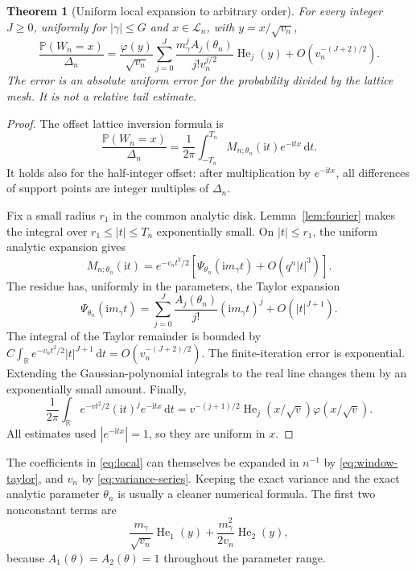\documentclass[11pt]{article}
\newtheorem{theorem}{Theorem}[section]
\theoremstyle{definition}
\newcommand{\Prob}{\mathbb P}
\newcommand{\He}{\operatorname{He}}
\newcommand{\dd}{\,\mathrm d}
\newcommand{\ii}{\mathrm i}
\begin{document}
\begin{theorem}[Uniform local expansion to arbitrary order]\label{thm:local}
For every integer $J\geq0$, uniformly for $|\gamma|\leq G$ and
$x\in\mathcal L_n$, with $y=x/\sqrt{v_n}$,
\begin{equation}\label{eq:local}
 \frac{\Prob(W_n=x)}{\Delta_n}
   =\frac{\varphi(y)}{\sqrt{v_n}}
      \sum_{j=0}^{J}
       \frac{m_\gamma^jA_j(\theta_n)}{j!v_n^{j/2}}\He_j(y)
      +O\!\left(v_n^{-(J+2)/2}\right).
\end{equation}
The error is an absolute uniform error for the probability divided by
the lattice mesh. It is not a relative tail estimate.
\end{theorem}

\begin{proof}
The offset lattice inversion formula is
\begin{equation}\label{eq:inversion}
 \frac{\Prob(W_n=x)}{\Delta_n}
    =\frac1{2\pi}\int_{-T_n}^{T_n}
          M_{n;\theta_n}(\ii t)e^{-\ii tx}\dd t.
\end{equation}
It holds also for the half-integer offset: after multiplication by
$e^{-\ii tx}$, all differences of support points are integer multiples
of $\Delta_n$.

Fix a small radius $r_1$ in the common analytic disk. Lemma~\ref{lem:fourier}
makes the integral over $r_1\leq|t|\leq T_n$ exponentially small.
On $|t|\leq r_1$, the uniform analytic expansion gives
\[
 M_{n;\theta_n}(\ii t)
   =e^{-v_nt^2/2}
       \left[\Psi_{\theta_n}(\ii m_\gamma t)+O(q^n|t|^3)\right].
\]
The residue has, uniformly in the parameters, the Taylor expansion
\[
 \Psi_{\theta_n}(\ii m_\gamma t)
   =\sum_{j=0}^{J}\frac{A_j(\theta_n)}{j!}(\ii m_\gamma t)^j
                       +O(|t|^{J+1}).
\]
The integral of the Taylor remainder is bounded by
$C\int_{\mathbb R}e^{-v_nt^2/2}|t|^{J+1}\dd t
=O(v_n^{-(J+2)/2})$. The finite-iteration error is exponential.
Extending the Gaussian-polynomial integrals to the real line changes
them by an exponentially small amount. Finally,
\[
 \frac1{2\pi}\int_{\mathbb R}e^{-vt^2/2}(\ii t)^j e^{-\ii tx}\dd t
       =v^{-(j+1)/2}\He_j(x/\sqrt v)\varphi(x/\sqrt v).
\]
All estimates used $|e^{-\ii tx}|=1$, so they are uniform in $x$.
\end{proof}

The coefficients in \eqref{eq:local} can themselves be expanded in
$n^{-1}$ by \eqref{eq:window-taylor}, and $v_n$ by
\eqref{eq:variance-series}. Keeping the exact variance and the exact
analytic parameter $\theta_n$ is usually a cleaner numerical formula.
The first two nonconstant terms are
\[
 \frac{m_\gamma}{\sqrt{v_n}}\He_1(y)
 +\frac{m_\gamma^2}{2v_n}\He_2(y),
\]
because $A_1(\theta)=A_2(\theta)=1$ throughout the parameter range.
\end{document}
